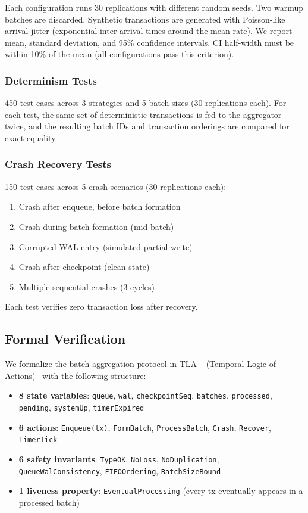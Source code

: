 Each configuration runs 30 replications with different random seeds. Two
warmup batches are discarded. Synthetic transactions are generated with
Poisson-like arrival jitter (exponential inter-arrival times around the mean
rate). We report mean, standard deviation, and 95\% confidence intervals.
CI half-width must be within 10\% of the mean (all configurations pass this
criterion).

\subsubsection{Determinism Tests}

450 test cases across 3 strategies and 5 batch sizes (30 replications each).
For each test, the same set of deterministic transactions is fed to the
aggregator twice, and the resulting batch IDs and transaction orderings are
compared for exact equality.

\subsubsection{Crash Recovery Tests}

150 test cases across 5 crash scenarios (30 replications each):
\begin{enumerate}
\item Crash after enqueue, before batch formation
\item Crash during batch formation (mid-batch)
\item Corrupted WAL entry (simulated partial write)
\item Crash after checkpoint (clean state)
\item Multiple sequential crashes (3 cycles)
\end{enumerate}

Each test verifies zero transaction loss after recovery.

\subsection{Formal Verification}
\label{sec:formal}

We formalize the batch aggregation protocol in TLA+ (Temporal Logic of
Actions)~\cite{lamport2002specifying} with the following structure:

\begin{itemize}
\item \textbf{8 state variables}: \texttt{queue}, \texttt{wal},
  \texttt{checkpointSeq}, \texttt{batches}, \texttt{processed}, \texttt{pending},
  \texttt{systemUp}, \texttt{timerExpired}
\item \textbf{6 actions}: \texttt{Enqueue(tx)}, \texttt{FormBatch},
  \texttt{ProcessBatch}, \texttt{Crash}, \texttt{Recover}, \texttt{TimerTick}
\item \textbf{6 safety invariants}: \texttt{TypeOK}, \texttt{NoLoss},
  \texttt{NoDuplication}, \texttt{QueueWalConsistency}, \texttt{FIFOOrdering},
  \texttt{BatchSizeBound}
\item \textbf{1 liveness property}: \texttt{EventualProcessing} (every tx
  eventually appears in a processed batch)
\end{itemize}

